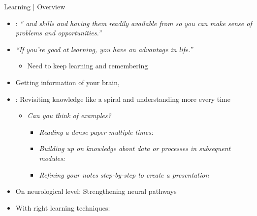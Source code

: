 \documentclass{ercisbeamer}
\begin{document}
\begin{frame}{Learning | Overview}
    \begin{tbox}
        \begin{itemize}
            \item {}: \emph{`` and skills and having them readily available from  so you can make sense of  problems and opportunities.'' }
            \item \emph{``If you're good at learning, you have an advantage in life.'' }
            \begin{itemize}
                \item Need to keep learning and remembering 
            \end{itemize}
            \item Getting information  of your brain,  \cite{agarwal19}
            \item {}: Revisiting knowledge like a spiral and understanding more every time
            \begin{itemize}
                \item \emph{Can you think of examples?} \pause
                \begin{itemize}
                    \item \emph{Reading a dense paper multiple times: }
                    \item \emph{Building up on knowledge about \emph{data} or \emph{processes} in subsequent modules: }
                    \item \emph{Refining your notes step-by-step to create a presentation}
                \end{itemize}
            \end{itemize}
            \item On neurological level: Strengthening neural pathways
            \item With right learning techniques: 
        \end{itemize}
    \end{tbox}
\end{frame}
\end{document}
